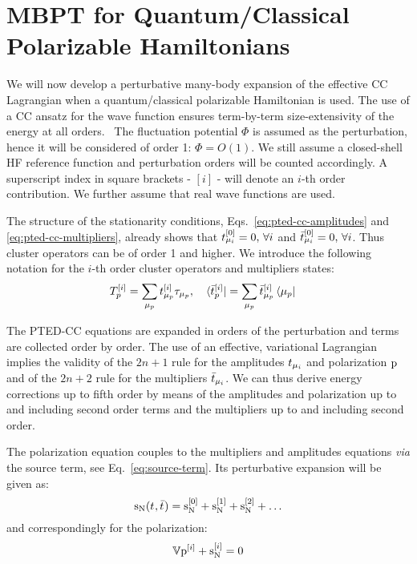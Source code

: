 \section[MBPT for Quantum/Classical Polarizable Hamiltonians]{
MBPT for Quantum/Classical Polarizable Hamiltonians}\label{sec:mbpt-polarizable}

We will now develop a perturbative many-body expansion of the effective
\acrshort{CC} Lagrangian when a quantum/classical polarizable Hamiltonian is
used.
The use of a \acrshort{CC} ansatz for the wave function ensures term-by-term
size-extensivity of the energy at all orders.~\autocite{Helgaker2000-tz}
The fluctuation potential $\Phi$ is assumed as the perturbation, hence
it will be considered of order 1: $\Phi = O(1)$.
We still assume a closed-shell \acrshort{HF} reference function and
perturbation orders will be counted accordingly.
A superscript index in square brackets - $[i]$ -  will denote an $i$-th
order contribution.
We further assume that real wave functions are used.

The structure of the stationarity conditions,
Eqs.~\eqref{eq:pted-cc-amplitudes} and \eqref{eq:pted-cc-multipliers},
already shows that $t_{\mu_i}^{[0]} = 0, \,\forall i$ and
$\bar{t}_{\mu_i}^{[0]} = 0, \, \forall i$.
Thus cluster operators can be of order 1 and higher. We introduce the
following notation for the $i$-th order cluster operators and
multipliers states:
\begin{alignat}{2}
  T_p^{[i]} = \sum_{\mu_p}t_{\mu_p}^{[i]}\tau_{\mu_p},
  \quad&
  \bra{\bar{t}_{p}^{[i]}} = \sum_{\mu_p}\bar{t}_{\mu_p}^{[i]}\bra{\mu_p}
\end{alignat}

The \acrshort{PTED}-\acrshort{CC} equations are expanded in orders of the
perturbation and terms are collected order by order. The use of an
effective, variational Lagrangian implies the validity of the $2n+1$
rule for the amplitudes $t_{\mu_i}$ and polarization $\mathrm{p}$ and of the
$2n+2$ rule for the multipliers $\bar{t}_{\mu_i}$.
We can thus derive energy corrections up to fifth order by means of the
amplitudes and polarization up to and including second order terms and
the multipliers up to and including second order.

The polarization equation couples to the multipliers and amplitudes
equations \emph{via} the source term, see Eq.~\eqref{eq:source-term}.
Its perturbative expansion will be given as:
\begin{equation}\label{eq:source-term-pt}
  \mathrm{s}_{\mathrm{N}}(t_{},\bar{t}_{}) =
  \mathrm{s}_{\mathrm{N}}^{[0]}
  + \mathrm{s}_{\mathrm{N}}^{[1]}
  + \mathrm{s}_{\mathrm{N}}^{[2]}
  + \ldots
\end{equation}
and correspondingly for the polarization:
\begin{equation}\label{eq:pol-eq-pt}
  \mathbb{V}\mathrm{p}^{[i]} + \mathrm{s}_{\mathrm{N}}^{[i]} = 0
\end{equation}

